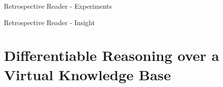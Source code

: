 \documentclass[10pt]{beamer}
\begin{document}
\begin{frame}{Retrospective Reader - Experiments}

    \begin{figure}
        \begin{center}
        \end{center}
    \end{figure}

\end{frame}

\begin{frame}{Retrospective Reader - Insight}

\end{frame}

\section{Differentiable Reasoning over a Virtual Knowledge Base}
\end{document}
